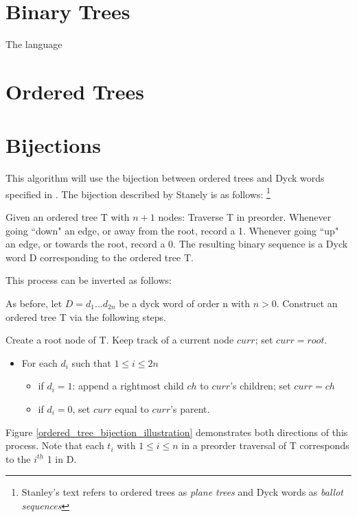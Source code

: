 
\section{Binary Trees}

The language
\section{Ordered Trees}
\section{Bijections}
This algorithm will use the bijection between ordered trees and Dyck words specified in \cite{stanley2015catalan}. The bijection described by Stanely is as follows:
\footnote{ Stanley's text refers to ordered trees as \emph{plane trees} and Dyck words as \emph{ballot sequences}} 


Given an ordered tree T with $n+1$ nodes: Traverse T in preorder.  Whenever going ``down" an edge, or away from the root, record a 1.  Whenever going ``up" an edge, or towards the root, record a 0.  The resulting binary sequence is a Dyck word D corresponding to the ordered tree T. 

This process can be inverted as follows: 

As before, let $D=d_1...d_{2n}$ be a dyck word of order n with $n > 0$. Construct an ordered tree T via the following steps. 

Create a root node of T.  Keep track of a current node $curr$; set $curr=root$.

\begin{itemize}
    \item For each $d_i$ such that $1 \le i \le 2n$ %
	\begin{itemize}
	    \item if $d_i=1$: append a rightmost child $ch$ to $curr$'s children; set $curr=ch$
	    \item if $d_i=0$, set $curr$ equal to $curr$'s parent.
	\end{itemize}

\end{itemize}
Figure \ref{ordered_tree_bijection_illustration} demonstrates both directions of this process. Note that each $t_i$ with $1 \le i \le n$ in a preorder traversal of T corresponds to the $i^{\underline{th}}$ 1 in D.

